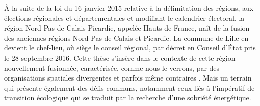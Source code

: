 \begin{refsegment}
À la suite de la loi du 16 janvier 2015 relative à la délimitation des régions, aux élections régionales et départementales et modifiant le calendrier électoral, la région Nord-Pas-de-Calais Picardie, appelée Hauts-de-France, naît de la fusion des anciennes régions Nord-Pas-de-Calais et Picardie. La commune de Lille en devient le chef-lieu, où siège le conseil régional, par décret en Conseil d'État pris le 28 septembre 2016. Cette thèse s'insère dans le contexte de cette région nouvellement fusionnée, caractérisée, comme nous le verrons, par des organisations spatiales divergentes et parfois même contraires \textcolor{blue}{\autocite[170]{frotey_acteurs_2021}}. Mais un terrain qui présente également des défis communs, notamment ceux liés à l'impératif de transition écologique qui se traduit par la recherche d'une sobriété énergétique.%


\end{refsegment}
